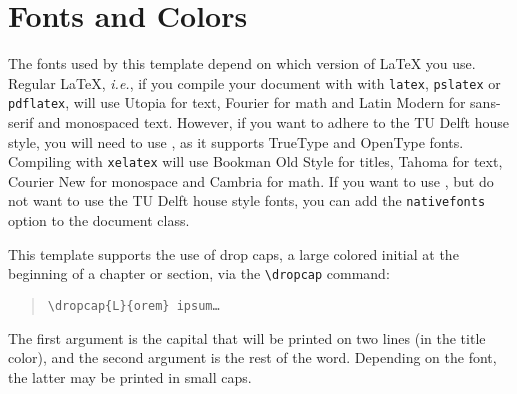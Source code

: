 \section{Fonts and Colors}

The fonts used by this template depend on which version of \LaTeX{} you use. Regular \LaTeX, \emph{i.e.}, if you compile your document with with \texttt{latex}, \texttt{pslatex} or \texttt{pdflatex}, will use Utopia for text, Fourier for math and Latin Modern for sans-serif and monospaced text. However, if you want to adhere to the TU Delft house style, you will need to use \XeLaTeX, as it supports TrueType and OpenType fonts. Compiling with \texttt{xelatex} will use Bookman Old Style for titles, Tahoma for text, Courier New for monospace and Cambria for math. If you want to use \XeLaTeX, but do not want to use the TU Delft house style fonts, you can add the \texttt{nativefonts} option to the document class.

This template supports the use of drop caps, a large colored initial at the beginning of a chapter or section, via the \texttt{\textbackslash dropcap} command:

\begin{quote}
\texttt{\textbackslash dropcap\{L\}\{orem\} ipsum\ldots}
\end{quote}
The first argument is the capital that will be printed on two lines (in the title color), and the second argument is the rest of the word. Depending on the font, the latter may be printed in small caps.

